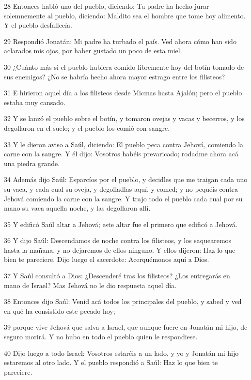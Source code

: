 \par 28 Entonces habló uno del pueblo, diciendo: Tu padre ha hecho jurar solemnemente al pueblo, diciendo: Maldito sea el hombre que tome hoy alimento. Y el pueblo desfallecía.
\par 29 Respondió Jonatán: Mi padre ha turbado el país. Ved ahora cómo han sido aclarados mis ojos, por haber gustado un poco de esta miel.
\par 30 ¿Cuánto más si el pueblo hubiera comido libremente hoy del botín tomado de sus enemigos? ¿No se habría hecho ahora mayor estrago entre los filisteos? 
\par 31 E hirieron aquel día a los filisteos desde Micmas hasta Ajalón; pero el pueblo estaba muy cansado.
\par 32 Y se lanzó el pueblo sobre el botín, y tomaron ovejas y vacas y becerros, y los degollaron en el suelo; y el pueblo los comió con sangre.
\par 33 Y le dieron aviso a Saúl, diciendo: El pueblo peca contra Jehová, comiendo la carne con la sangre. Y él dijo: Vosotros habéis prevaricado; rodadme ahora acá una piedra grande.
\par 34 Además dijo Saúl: Esparcíos por el pueblo, y decidles que me traigan cada uno su vaca, y cada cual su oveja, y degolladlas aquí, y comed; y no pequéis contra Jehová comiendo la carne con la sangre. Y trajo todo el pueblo cada cual por su mano su vaca aquella noche, y las degollaron allí.
\par 35 Y edificó Saúl altar a Jehová; este altar fue el primero que edificó a Jehová.
\par 36 Y dijo Saúl: Descendamos de noche contra los filisteos, y los saquearemos hasta la mañana, y no dejaremos de ellos ninguno. Y ellos dijeron: Haz lo que bien te pareciere. Dijo luego el sacerdote: Acerquémonos aquí a Dios.
\par 37 Y Saúl consultó a Dios: ¿Descenderé tras los filisteos? ¿Los entregarás en mano de Israel? Mas Jehová no le dio respuesta aquel día.
\par 38 Entonces dijo Saúl: Venid acá todos los principales del pueblo, y sabed y ved en qué ha consistido este pecado hoy;
\par 39 porque vive Jehová que salva a Israel, que aunque fuere en Jonatán mi hijo, de seguro morirá. Y no hubo en todo el pueblo quien le respondiese.
\par 40 Dijo luego a todo Israel: Vosotros estaréis a un lado, y yo y Jonatán mi hijo estaremos al otro lado. Y el pueblo respondió a Saúl: Haz lo que bien te pareciere.
